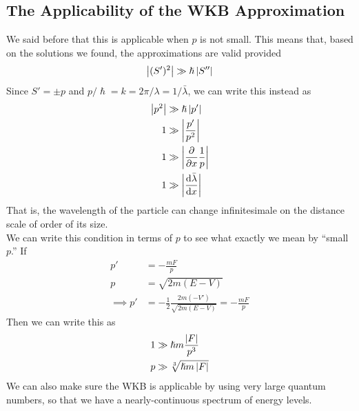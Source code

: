 \documentclass[a4paper]{article}
\begin{document}
\subsection{The Applicability of the WKB Approximation}
We said before that this is applicable when $p$ is not small. This means that,
based on the solutions we found, the approximations are valid provided
\[
	\left\lvert (S')^2\right\rvert \gg \hslash\left\lvert S''\right\rvert
\]
Since $S' = \pm p$ and $p/\hslash = k = 2\pi/\lambda=1/\bar{\lambda}$,
we can write this instead as
\begin{align*}
	\abs{p^2} &\gg \hslash\abs{p'}\\
	1 &\gg \abs{\frac{p'}{p^2}}\\
	1 &\gg \abs{\pd{x}\frac{1}{p}}\\
	1 &\gg \abs{\der{\bar{\lambda}}{x}}
\end{align*}
That is, the wavelength of the particle can change infinitesimale on the
distance scale of order of its size.\\
We can write this condition in terms of $p$ to see what exactly we mean by
``small $p$.'' If
\begin{align*}
	p' &= -\frac{mF}{p}\\
	p &= \sqrt{2m(E-V)}\\
	\implies p' &= -\frac{1}{2} \frac{2m(-V')}{\sqrt{2m(E-V)}} =
	-\frac{mF}{p}
\end{align*}
Then we can write this as
\begin{align*}
	1 &\gg \hslash m \frac{\left\lvert F\right\rvert}{p^3}\\
	p &\gg \sqrt[3]{\hslash m\left\lvert F\right\rvert}
\end{align*}
We can also make sure the WKB is applicable by using very large quantum
numbers, so that we have a nearly-continuous spectrum of energy levels.
\end{document}
